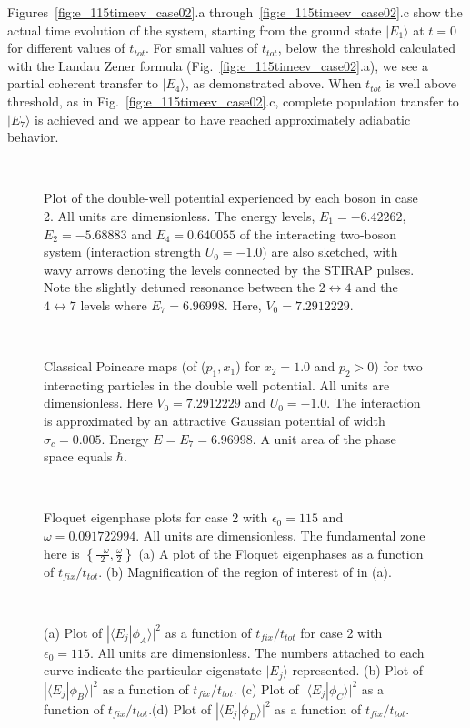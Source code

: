 Figures~\ref{fig:e_115timeev_case02}.a through~\ref{fig:e_115timeev_case02}.c show the actual time evolution of the system, starting from the ground state $|E_1\rangle$ at $t = 0$ for different values of $t_{tot}$. For small values of $t_{tot}$, below the threshold calculated with the Landau Zener formula (Fig.~\ref{fig:e_115timeev_case02}.a), we see a partial coherent transfer to $|E_4\rangle$, as demonstrated above. 
When $t_{tot}$ is well above threshold, as in Fig.~\ref{fig:e_115timeev_case02}.c,  complete population transfer to $|E_7\rangle$ is achieved and we appear to have reached approximately  adiabatic behavior. 
%
%
\clearpage
\begin{figure} 
\ 
\caption{Plot of the double-well potential experienced by each boson in case 2. All units are dimensionless. The energy levels, $E_1=-6.42262$, $E_2=-5.68883$ and $E_4=0.640055$  of the interacting two-boson system (interaction strength  $U_0=-1.0$) are also sketched, with wavy arrows denoting the levels connected by the STIRAP pulses. Note the slightly detuned resonance between the $2 \leftrightarrow 4$ and the $4 \leftrightarrow 7$ levels where $E_7=6.96998$. Here, $V_0=7.2912229$.}
\label{fig:doublewell_case02}
\end{figure}
\begin{figure} 
\ 
\caption{Classical Poincare maps (of  ($p_1,x_1$) for $x_2=1.0$ and $p_2>0$) for two interacting particles in the double well potential. All units are dimensionless. Here $V_0 = 7.2912229$ and $U_0 = -1.0 $. The interaction is approximated by an attractive Gaussian  potential of width $\sigma_c = 0.005$. Energy $E=E_7=6.96998$. A unit area of the phase space equals $\hbar$.}
\label{fig:classicalpncr_case02}
\end{figure}
\begin{figure} 
\ 
\caption{Floquet eigenphase plots for case 2 with $\epsilon_0=115$ and $\omega = 0.091722994$. All units are dimensionless.  The fundamental zone here is $\left\lbrace \frac{-\omega}{2} , \frac{\omega}{2}\right\rbrace $ (a) A  plot of the Floquet eigenphases as a function of $t_{fix}/t_{tot}$. (b) Magnification of the region of interest of in (a).}
\label{fig:phase_case02}
\end{figure}
\begin{figure}
\ 
\caption{(a) Plot of $|{\langle}E_j|{\phi}_A{\rangle}|^2$ as a function of $t_{fix}/t_{tot}$ for case 2 with $\epsilon_0 = 115$. All units are dimensionless.  The numbers attached to each curve indicate the particular eigenstate $|E_j{\rangle}$ represented.  (b) Plot of $|{\langle}E_j|{\phi}_B{\rangle}|^2$ as a function of $t_{fix}/t_{tot}$. (c) Plot of $|{\langle}E_j|{\phi}_C{\rangle}|^2$ as a function of $t_{fix}/t_{tot}$.(d) Plot of $|{\langle}E_j|{\phi}_D{\rangle}|^2$ as a function of $t_{fix}/t_{tot}$.}
\label{fig:states_case02}
\end{figure}
